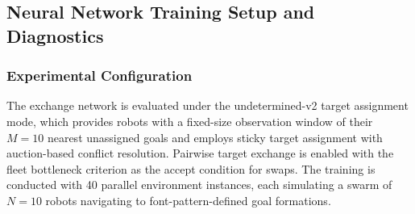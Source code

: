 
\subsection{Neural Network Training Setup and Diagnostics}

\subsubsection{Experimental Configuration}

The exchange network is evaluated under the undetermined-v2 target assignment mode, which provides robots with a fixed-size observation window of their $M = 10$ nearest unassigned goals and employs sticky target assignment with auction-based conflict resolution. Pairwise target exchange is enabled with the fleet bottleneck criterion as the accept condition for swaps. The training is conducted with 40 parallel environment instances, each simulating a swarm of $N = 10$ robots navigating to font-pattern-defined goal formations.

